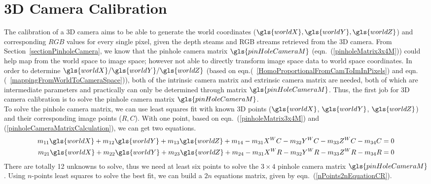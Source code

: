 \section{\gls{3D} Camera Calibration}
\label{section3DcameraCalibration}
\indent
The calibration of a \gls{3D} camera aims to be able to generate the world coordinates (\(\gls{worldX}, \gls{worldY}, \gls{worldZ}\)) and corresponding \(RGB\) values for every single pixel, given the depth steams and RGB streams retrieved from the \gls{3D} camera. From Section~\ref{sectionPinholeCamera}, we know that the pinhole camera matrix \(\gls{pinHoleCameraM}\) (eqn.~(\ref{pinholeMatrix3x4M})) could help map from the world space to image space; however not able to directly transform image space data to world space coordinates. In order to determine \(\gls{worldX}/\gls{worldY}/\gls{worldZ}\) (based on eqn.(~\ref{HomoProportionalFromCamToImInPixels}) and eqn.(~\ref{mappingFromWorldToCameraSpace})), both of the intrinsic camera matrix and extrinsic camera matrix are needed, both of which are intermediate parameters and practically can only be determined through matrix \(\gls{pinHoleCameraM}\). Thus, the first job for \gls{3D} camera calibration is to solve the pinhole camera matrix \(\gls{pinHoleCameraM}\).
\\\indent
To solve the pinhole camera matrix, we can use least squares fit with known \gls{3D} points (\(\gls{worldX}\), \(\gls{worldY}\), \(\gls{worldZ}\)) and their corresponding image points (\(R, C\)). With one point, based on eqn.~(\ref{pinholeMatrix3x4M}) and (\ref{pinholeCameraMatrixCalculation}), we can get two equations.
\begin{equation}
\begin{aligned}
m_{11}\gls{worldX} + m_{12}\gls{worldY} + m_{13}\gls{worldZ} + m_{14} - m_{31}X^WC - m_{32}Y^WC - m_{33}Z^WC - m_{34}C = 0%
\\%
m_{21}\gls{worldX} + m_{22}\gls{worldY} + m_{23}\gls{worldZ} + m_{24} - m_{31}X^WR - m_{32}Y^WR - m_{33}Z^WR - m_{34}R = 0
\end{aligned}
\label{onePointEquationCR}
\end{equation}%
\noindent
There are totally 12 unknowns to solve, thus we need at least six points to solve the $3\times4$ pinhole camera matrix \(\gls{pinHoleCameraM}\). Using $n$-points least squares to solve the best fit, we can build a $2n$ equations matrix, given by eqn.~(\ref{nPoints2nEquationCR}).

